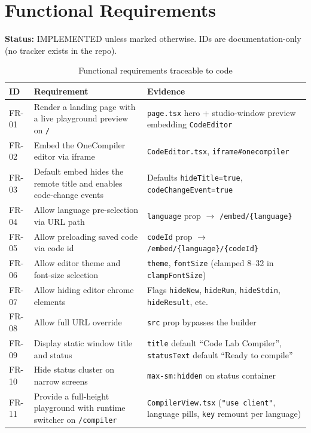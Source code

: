 \section{Functional Requirements}
\label{sec:functional-requirements}

\textbf{Status:} IMPLEMENTED unless marked otherwise. IDs are documentation-only (no tracker exists in the repo).

\begin{table}[H]
\centering
\caption{Functional requirements traceable to code}
\begin{tabular}{|l|p{6cm}|p{5.5cm}|}
\hline
\textbf{ID} & \textbf{Requirement} & \textbf{Evidence} \\ \hline
FR-01 & Render a landing page with a live playground preview on \texttt{/} & \texttt{page.tsx} hero + studio-window preview embedding \texttt{CodeEditor} \\ \hline
FR-02 & Embed the OneCompiler editor via iframe & \texttt{CodeEditor.tsx}, \texttt{iframe\#onecompiler} \\ \hline
FR-03 & Default embed hides the remote title and enables code-change events & Defaults \texttt{hideTitle=true}, \texttt{codeChangeEvent=true} \\ \hline
FR-04 & Allow language pre-selection via URL path & \texttt{language} prop $\rightarrow$ \texttt{/embed/\{language\}} \\ \hline
FR-05 & Allow preloading saved code via code id & \texttt{codeId} prop $\rightarrow$ \texttt{/embed/\{language\}/\{codeId\}} \\ \hline
FR-06 & Allow editor theme and font-size selection & \texttt{theme}, \texttt{fontSize} (clamped 8--32 in \texttt{clampFontSize}) \\ \hline
FR-07 & Allow hiding editor chrome elements & Flags \texttt{hideNew}, \texttt{hideRun}, \texttt{hideStdin}, \texttt{hideResult}, etc. \\ \hline
FR-08 & Allow full URL override & \texttt{src} prop bypasses the builder \\ \hline
FR-09 & Display static window title and status & \texttt{title} default ``Code Lab Compiler'', \texttt{statusText} default ``Ready to compile'' \\ \hline
FR-10 & Hide status cluster on narrow screens & \texttt{max-sm:hidden} on status container \\ \hline
FR-11 & Provide a full-height playground with runtime switcher on \texttt{/compiler} & \texttt{CompilerView.tsx} (\texttt{"use client"}, language pills, \texttt{key} remount per language) \\ \hline

\end{tabular}
\end{table}

